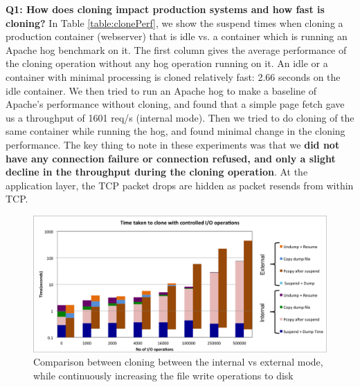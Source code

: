
\textbf{ Q1: How does cloning impact production systems and how fast is cloning?  }
In Table \ref {table:clonePerf}, we show the suspend times when cloning a production container (webserver) that is idle vs. a container which is running an Apache hog benchmark \cite{httperf} on it. 
The first column gives the average performance of the cloning operation without any hog operation running on it.  
An idle or a container with minimal processing is cloned relatively fast: 2.66 seconds on the idle container. 
We then tried to run an Apache hog to make a baseline of Apache's performance without cloning, and found that a simple page fetch gave us a throughput of 1601 req/s (internal mode). Then we tried to do cloning of the same container while running the hog, and found minimal change in the cloning performance.
The key thing to note in these experiments was that we \textbf{did not have any connection failure or connection refused, and only a slight decline in the throughput during the cloning operation}. 
At the application layer, the TCP packet drops are hidden as packet resends from within TCP.
\iffalse
\begin{figure}[t]
	\begin{center}
		\includegraphics[width=1\textwidth]{figs/fioResult.png}
		\caption{Comparison between cloning between the internal vs external mode, while continuously increasing the file write operations to disk}
		\label{fig:fioResults}
	\end{center}
\end{figure}
